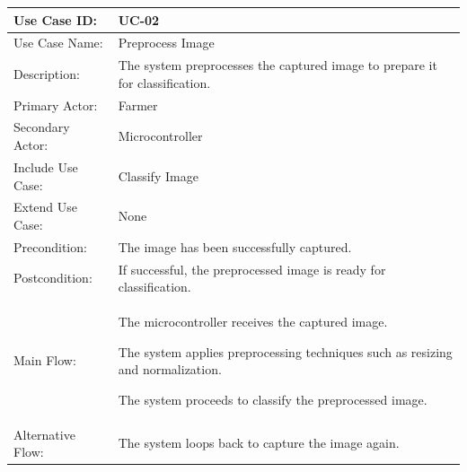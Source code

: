 \begin{thesisprose}
\FloatBarrier
\begingroup
\small
\setlength{\tabcolsep}{3pt}
\renewcommand{\arraystretch}{1.14}
\setlength{\arrayrulewidth}{0.625pt}
\def\LTcaptype{uncaptionedgrid}
\begin{longtable}{|>{\raggedright\arraybackslash}p{}|>{\raggedright\arraybackslash}p{}|}
\hline
Use Case ID: & UC-02 \\
\hline
Use Case Name: & Preprocess Image \\
\hline
Description: & The system preprocesses the captured image to prepare it for classification. \\
\hline
Primary Actor: & Farmer \\
\hline
Secondary Actor: & Microcontroller \\
\hline
Include Use Case: & Classify Image \\
\hline
Extend Use Case: & None \\
\hline
Precondition: & The image has been successfully captured. \\
\hline
Postcondition: & If successful, the preprocessed image is ready for classification. \\
\hline
Main Flow: & The microcontroller receives the captured image.\par The system applies preprocessing techniques such as resizing and normalization.\par The system proceeds to classify the preprocessed image. \\
\hline
Alternative Flow: & The system loops back to capture the image again. \\
\hline
\end{longtable}
\endgroup


\end{thesisprose}
